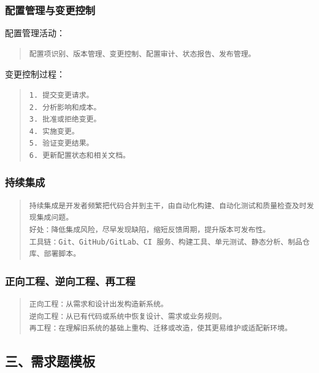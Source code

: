 \documentclass[UTF8,zihao=-4]{ctexart}
\begin{document}
\subsubsection{配置管理与变更控制}


配置管理活动：


\begin{quote}
\footnotesize
\begin{verbatim}
配置项识别、版本管理、变更控制、配置审计、状态报告、发布管理。
\end{verbatim}
\end{quote}


变更控制过程：


\begin{quote}
\footnotesize
\begin{verbatim}
1. 提交变更请求。
2. 分析影响和成本。
3. 批准或拒绝变更。
4. 实施变更。
5. 验证变更结果。
6. 更新配置状态和相关文档。
\end{verbatim}
\end{quote}


\subsubsection{持续集成}


\begin{quote}
\footnotesize
\begin{verbatim}
持续集成是开发者频繁把代码合并到主干，由自动化构建、自动化测试和质量检查及时发现集成问题。
好处：降低集成风险，尽早发现缺陷，缩短反馈周期，提升版本可发布性。
工具链：Git、GitHub/GitLab、CI 服务、构建工具、单元测试、静态分析、制品仓库、部署脚本。
\end{verbatim}
\end{quote}


\subsubsection{正向工程、逆向工程、再工程}


\begin{quote}
\footnotesize
\begin{verbatim}
正向工程：从需求和设计出发构造新系统。
逆向工程：从已有代码或系统中恢复设计、需求或业务规则。
再工程：在理解旧系统的基础上重构、迁移或改造，使其更易维护或适配新环境。
\end{verbatim}
\end{quote}


\subsection{三、需求题模板}
\end{document}
